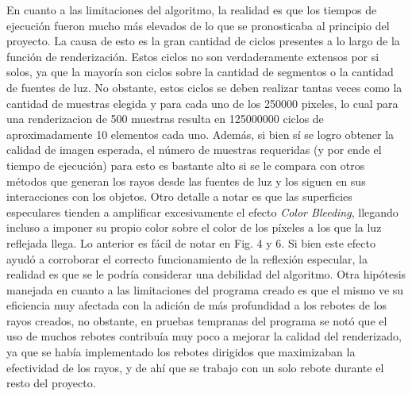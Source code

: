 \documentclass[conference]{IEEEtran}
\begin{document}
En cuanto a las limitaciones del algoritmo, la realidad es que los tiempos de ejecución fueron mucho más elevados de lo que se pronosticaba al principio del proyecto. La causa de esto es la gran cantidad de ciclos presentes a lo largo de la función de renderización. Estos ciclos no son verdaderamente extensos por si solos, ya que la mayoría son ciclos sobre la cantidad de segmentos o la cantidad de fuentes de luz. No obstante, estos ciclos se deben realizar tantas veces como la cantidad de muestras elegida y para cada uno de los 250000 pixeles, lo cual para una renderizacion de 500 muestras resulta en 125000000 ciclos de aproximadamente 10 elementos cada uno. Además, si bien sí se logro obtener la calidad de imagen esperada, el número de muestras requeridas (y por ende el tiempo de ejecución) para esto es bastante alto si se le compara con otros métodos que generan los rayos desde las fuentes de luz y los siguen en sus interacciones con los objetos. Otro detalle a notar es que las superficies especulares tienden a amplificar excesivamente el efecto \textit{Color Bleeding}, llegando incluso a imponer su propio color sobre el color de los píxeles a los que la luz reflejada llega. Lo anterior es fácil de notar en Fig. 4 y 6. Si bien este efecto ayudó a corroborar el correcto funcionamiento de la reflexión especular, la realidad es que se le podría considerar una debilidad del algoritmo. Otra hipótesis manejada en cuanto a las limitaciones del programa creado es que el mismo ve su eficiencia muy afectada con la adición de más profundidad a los rebotes de los rayos creados, no obstante, en pruebas tempranas del programa se notó que el uso de muchos rebotes contribuía muy poco a mejorar la calidad del renderizado, ya que se había implementado los rebotes dirigidos que maximizaban la efectividad de los rayos, y de ahí que se trabajo con un solo rebote durante el resto del proyecto. 
\end{document}
